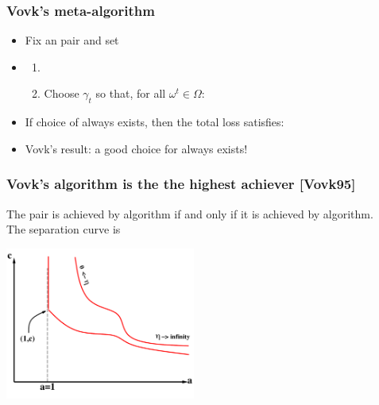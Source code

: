 \documentclass{beamer}
\begin{document}
\begin{frame}
\frametitle{Vovk's meta-algorithm}
\begin{itemize}
\item Fix an  pair  and set 
\item \begin{enumerate}
\item
{}
\item
Choose $\gamma_t$ so that, for all $\omega^t \in \Omega$:
\end{enumerate}
\item
If choice of  always exists, then the total loss satisfies:
\item
Vovk's result:  a good choice for  always exists!
\end{itemize}
\end{frame}

\begin{frame}
\frametitle{Vovk's algorithm is the the highest achiever {\color{green} [Vovk95]}}

The pair  is achieved by  algorithm 
if and only if it is achieved by  algorithm.
\pause \\
The separation curve is
\pause
\begin{center}
\includegraphics[height=5cm]{figures/achievable2.pdf}
\end{center}
\end{frame}
\end{document}
